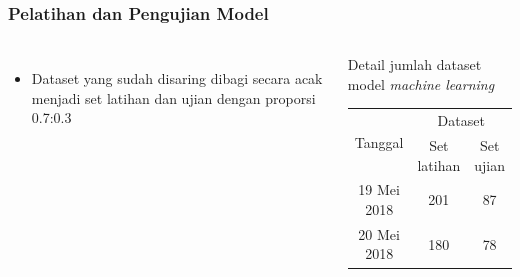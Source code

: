 \documentclass[8pt]{beamer}
\begin{document}
\begin{frame}
  \frametitle{Pelatihan dan Pengujian Model}
  \begin{columns}[T]
      \begin{itemize}
        \item Dataset yang sudah disaring dibagi secara acak menjadi set latihan dan ujian dengan proporsi 0.7:0.3 
      \end{itemize}
          \begin{block}{\center Detail jumlah dataset model \textit{machine learning}}
      \begin{table}[H]
        \begin{center}
          \label{table:dataset}
          \begin{tabular}{|c|cc|}
            \hline
            \multirow{2}{*}{Tanggal} & \multicolumn{2}{c|}{Dataset}                 \\ \cline{2-3} 
             & \multicolumn{1}{c|}{Set latihan} & Set ujian \\ \hline
            19 Mei 2018              & \multicolumn{1}{c|}{201}         & 87        \\ \hline
            20 Mei 2018              & \multicolumn{1}{c|}{180}         & 78        \\ \hline
          \end{tabular}
        \end{center}
      \end{table}
          \end{block}
  \end{columns}
\end{frame}


\end{document}
